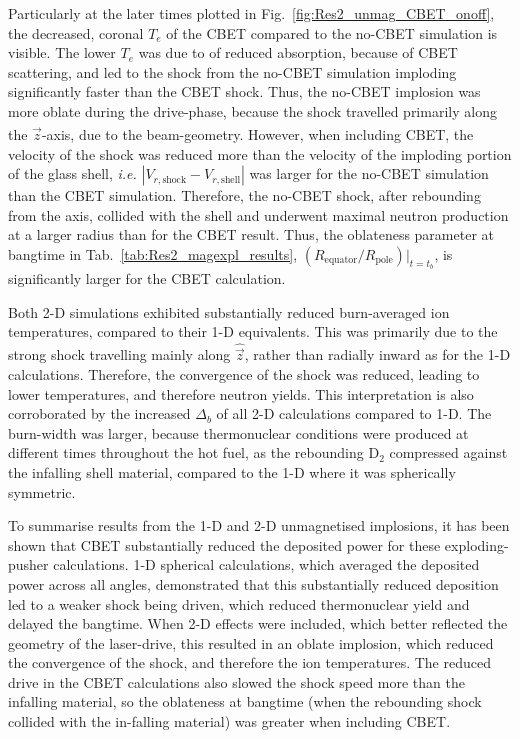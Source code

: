 Particularly at the later times plotted in Fig.~\ref{fig:Res2_unmag_CBET_onoff}, the decreased, coronal $T_e$ of the \ac{CBET} compared to the no-\ac{CBET} simulation is visible.
The lower $T_e$ was due to of reduced absorption, because of \ac{CBET} scattering, and led to the shock from the no-\ac{CBET} simulation imploding significantly faster than the \ac{CBET} shock.
Thus, the no-\ac{CBET} implosion was more oblate during the drive-phase, because the shock travelled primarily along the $\hat{\vec{z}}$-axis, due to the beam-geometry.
However, when including \ac{CBET}, the velocity of the shock was reduced more than the velocity of the imploding portion of the glass shell, \textit{i.e.} $|V_{r,\text{shock}} - V_{r,\text{shell}}|$ was larger for the no-\ac{CBET} simulation than the \ac{CBET} simulation.
Therefore, the no-\ac{CBET} shock, after rebounding from the axis, collided with the shell and underwent maximal neutron production at a larger radius than for the \ac{CBET} result.
Thus, the oblateness parameter at bangtime in Tab.~\ref{tab:Res2_magexpl_results}, $(R_{\text{equator}}/R_{\text{pole}})|_{t=t_b}$, is significantly larger for the \ac{CBET} calculation.

Both 2-D simulations exhibited substantially reduced burn-averaged ion temperatures, compared to their 1-D equivalents.
This was primarily due to the strong shock travelling mainly along $\hat{\vec{z}}$, rather than radially inward as for the 1-D calculations.
Therefore, the convergence of the shock was reduced, leading to lower temperatures, and therefore neutron yields.
This interpretation is also corroborated by the increased $\Delta_b$ of all 2-D calculations compared to 1-D.
The burn-width was larger, because thermonuclear conditions were produced at different times throughout the hot fuel, as the rebounding $\text{D}_2$ compressed against the infalling shell material, compared to the 1-D where it was spherically symmetric.

To summarise results from the 1-D and 2-D unmagnetised implosions, it has been shown that \ac{CBET} substantially reduced the deposited power for these exploding-pusher calculations.
1-D spherical calculations, which averaged the deposited power across all angles, demonstrated that this substantially reduced deposition led to a weaker shock being driven, which reduced thermonuclear yield and delayed the bangtime.
When 2-D effects were included, which better reflected the geometry of the laser-drive, this resulted in an oblate implosion, which reduced the convergence of the shock, and therefore the ion temperatures.
The reduced drive in the \ac{CBET} calculations also slowed the shock speed more than the infalling material, so the oblateness at bangtime (when the rebounding shock collided with the in-falling material) was greater when including \ac{CBET}.

